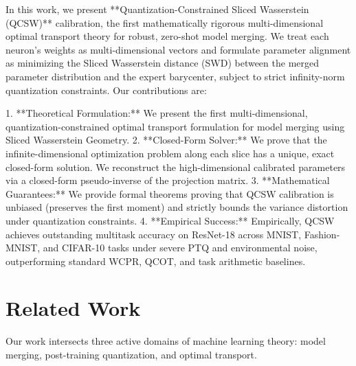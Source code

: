 \documentclass{article}
\theoremstyle{plain}
\theoremstyle{definition}
\theoremstyle{remark}
\begin{document}
In this work, we present **Quantization-Constrained Sliced Wasserstein (QCSW)** calibration, the first mathematically rigorous multi-dimensional optimal transport theory for robust, zero-shot model merging. We treat each neuron's weights as multi-dimensional vectors and formulate parameter alignment as minimizing the Sliced Wasserstein distance (SWD) between the merged parameter distribution and the expert barycenter, subject to strict infinity-norm quantization constraints. Our contributions are:

1. **Theoretical Formulation:** We present the first multi-dimensional, quantization-constrained optimal transport formulation for model merging using Sliced Wasserstein Geometry.
2. **Closed-Form Solver:** We prove that the infinite-dimensional optimization problem along each slice has a unique, exact closed-form solution. We reconstruct the high-dimensional calibrated parameters via a closed-form pseudo-inverse of the projection matrix.
3. **Mathematical Guarantees:** We provide formal theorems proving that QCSW calibration is unbiased (preserves the first moment) and strictly bounds the variance distortion under quantization constraints.
4. **Empirical Success:** Empirically, QCSW achieves outstanding multitask accuracy on ResNet-18 across MNIST, Fashion-MNIST, and CIFAR-10 tasks under severe PTQ and environmental noise, outperforming standard WCPR, QCOT, and task arithmetic baselines.

\section{Related Work}
\label{sec:related}

Our work intersects three active domains of machine learning theory: model merging, post-training quantization, and optimal transport.
\end{document}
